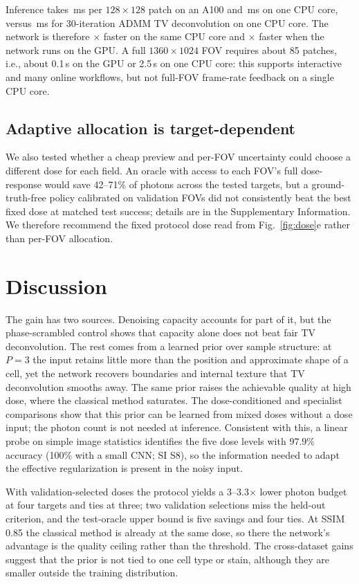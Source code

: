 \documentclass[preprint,12pt]{elsarticle}
\begin{document}
Inference takes \SpeedGPU\,ms per $128\times128$ patch on an A100 and
\SpeedCPU\,ms on one CPU core, versus \SpeedTV\,ms for 30-iteration ADMM TV
deconvolution on one CPU core. The network is therefore \SpeedFactorCPU$\times$
faster on the same CPU core and \SpeedFactorGPU$\times$ faster when the network
runs on the GPU. A full $1360\times1024$ FOV requires about 85 patches, i.e.,
about 0.1\,s on the GPU or 2.5\,s on one CPU core: this supports interactive and
many online workflows, but not full-FOV frame-rate feedback on a single CPU
core.





\subsection{Adaptive allocation is target-dependent}
We also tested whether a cheap preview and per-FOV uncertainty could choose a
different dose for each field. An oracle with access to each FOV's full
dose-response would save 42--71\% of photons across the tested targets, but a ground-truth-free policy
calibrated on validation FOVs did not consistently beat the best fixed dose at
matched test success; details are in the Supplementary Information. We
therefore recommend the fixed protocol dose read from Fig.~\ref{fig:dose}e
rather than per-FOV allocation.

\section{Discussion}
The gain has two sources. Denoising capacity accounts for part of it, but the
phase-scrambled control shows that capacity alone does not beat fair TV
deconvolution. The rest comes from a learned prior over sample structure: at
$P=3$ the input retains little more than the
position and approximate shape of a cell, yet the network recovers boundaries
and internal texture that TV deconvolution smooths away. The same prior raises
the achievable quality at high dose, where the classical method saturates. The
dose-conditioned and specialist comparisons show that this prior can be learned
from mixed doses without a dose input; the photon count is not needed at
inference. Consistent with this, a linear probe on simple image statistics
identifies the five dose levels with 97.9\% accuracy (100\% with a small CNN;
SI S8), so the information needed to adapt the effective regularization is
present in the noisy input.

With validation-selected doses the protocol yields a 3--3.3$\times$ lower
photon budget at four targets and ties at three; two validation selections miss
the held-out criterion, and the test-oracle upper bound is five savings and
four ties. At SSIM 0.85 the classical method is already at the same dose, so there
the network's advantage is the quality ceiling rather than the threshold. The
cross-dataset
gains suggest that the prior is not tied to one cell type or stain, although
they are smaller outside the training distribution.
\end{document}
